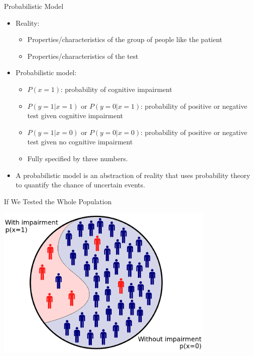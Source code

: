 \documentclass{beamer}
\begin{document}
\begin{frame}{Probabilistic Model}
\begin{itemize}
  \item Reality:
  \begin{itemize}
    \item Properties/characteristics of the group of people like the patient
    \item Properties/characteristics of the test
  \end{itemize}
\item Probabilistic model:
  \begin{itemize}
    \item $P(x = 1)$: probability of cognitive impairment
    \item $P(y = 1|x = 1)$ or $P(y = 0|x = 1)$: probability of positive or negative test given cognitive impairment
    \item $P(y = 1|x = 0)$ or $P(y = 0|x = 0)$: probability of positive or negative test given no cognitive impairment
  \item Fully specified by three numbers.
  \end{itemize}

  \item A probabilistic model is an abstraction of reality that uses probability theory to quantify the chance of uncertain events.
\end{itemize}
\end{frame}

\begin{frame}{If We Tested the Whole Population}
  \begin{center}
    \includegraphics[width=0.8\textwidth]{whole_population.png}
  \end{center}
\end{frame}
\end{document}
